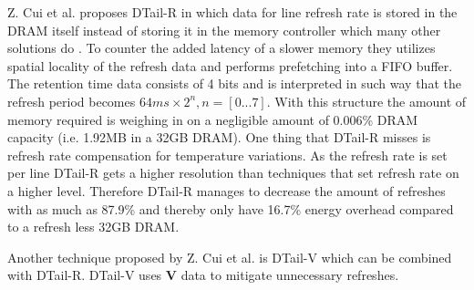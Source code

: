 Z. Cui et al. \cite{dtail} proposes DTail-R in which data for line refresh rate is stored in the DRAM itself instead of storing it in the memory controller which many other solutions do \cite{raidr}\cite{smartrefresh}\cite{refrint}. To counter the added latency of a slower memory they utilizes spatial locality of the refresh data and performs prefetching into a FIFO buffer. The retention time data consists of 4 bits and is interpreted in such way that the refresh period becomes \(64ms \times 2^n, n = [0...7]\). With this structure the amount of memory required is weighing in on a negligible amount of 0.006\% DRAM capacity (i.e. 1.92MB in a 32GB DRAM). One thing that DTail-R misses is refresh rate compensation for temperature variations. As the refresh rate is set per line DTail-R gets a higher resolution than techniques that set refresh rate on a higher level. Therefore DTail-R manages to decrease the amount of refreshes with as much as 87.9\% and thereby only have 16.7\% energy overhead compared to a refresh less 32GB DRAM. 

Another technique proposed by Z. Cui et al. is DTail-V \cite{dtail} which can be combined with DTail-R. DTail-V uses \textbf{V} data to mitigate unnecessary refreshes. 

